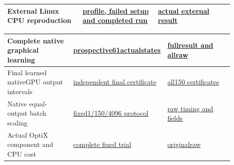 \documentclass[11pt]{article}
\begin{document}
\begin{small}
\begin{longtable}{@{}p{0.307\linewidth} p{0.307\linewidth} p{0.307\linewidth}@{}}
External Linux CPU reproduction & \href{https://github.com/Agnuxo1/Neuro3D/blob/a6d0fbec5011bdc76abad71edac86519016348f4/Docs/EXTERNAL\_CPU\_REPRODUCTION\_PROTOCOL\_2026-10-09.md}{profile, failed setup and completed run} & \href{https://github.com/Agnuxo1/Neuro3D/blob/a6d0fbec5011bdc76abad71edac86519016348f4/Docs/validation/external-cpu-reproduction-2026-10-09/attempt02/artifact/result.json}{actual external result} \\
\bottomrule\end{longtable}\end{small}

\begin{small}\begin{longtable}{@{}p{0.307\linewidth} p{0.307\linewidth} p{0.307\linewidth}@{}}\toprule
Complete native graphical learning & \href{https://github.com/Agnuxo1/Neuro3D/blob/a6d0fbec5011bdc76abad71edac86519016348f4/Docs/NATIVE\_DEFERRED\_GRAPHICS\_TRAINING\_PROTOCOL\_2026-10-09.md}{prospective61actualstates} & \href{https://github.com/Agnuxo1/Neuro3D/blob/a6d0fbec5011bdc76abad71edac86519016348f4/Docs/validation/native-deferred-training-2026-10-09/attempt01/evidence\_index.json}{fullresult and allraw} \\
\midrule
Final learned nativeGPU output intervals & \href{https://github.com/Agnuxo1/Neuro3D/blob/a6d0fbec5011bdc76abad71edac86519016348f4/Docs/NATIVE\_DEFERRED\_TRAINING\_FIELD\_CERTIFICATE\_PROTOCOL\_2026-10-09.md}{independent final certificate} & \href{https://github.com/Agnuxo1/Neuro3D/blob/a6d0fbec5011bdc76abad71edac86519016348f4/Docs/validation/native-deferred-training-certificate-2026-10-09/attempt01/worker/certificate.json}{all150 certificates} \\
Native equal-output batch scaling & \href{https://github.com/Agnuxo1/Neuro3D/blob/a6d0fbec5011bdc76abad71edac86519016348f4/Docs/NATIVE\_GRAPHICS\_SCALING\_PROTOCOL\_2026-10-09.md}{fixed1/150/4096 protocol} & \href{https://github.com/Agnuxo1/Neuro3D/blob/a6d0fbec5011bdc76abad71edac86519016348f4/Docs/validation/native-graphics-scaling-2026-10-09/attempt02/evidence\_index.json}{raw timing and fields} \\
Actual OptiX component and CPU cost & \href{https://github.com/Agnuxo1/Neuro3D/blob/a6d0fbec5011bdc76abad71edac86519016348f4/Docs/NATIVE\_CYCLES\_OPTIX\_COMPONENT\_V2\_PROTOCOL\_2026-10-09.md}{complete fixed trial} & \href{https://github.com/Agnuxo1/Neuro3D/blob/a6d0fbec5011bdc76abad71edac86519016348f4/Docs/validation/native-cycles-optix-2026-10-09/attempt02/evidence\_index.json}{originalraw} \\

\end{longtable}
\end{small}
\end{document}
